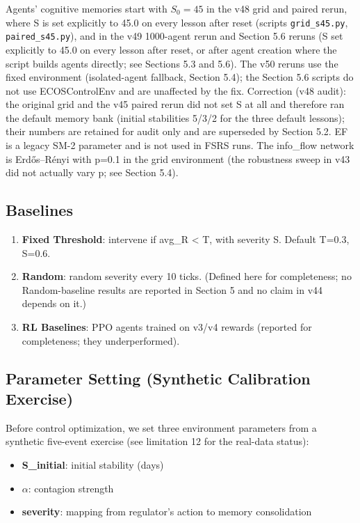 \documentclass[11pt]{article}
\begin{document}
Agents' cognitive memories start with $S_0 = 45$ in the v48 grid and paired rerun, where S is set explicitly to 45.0 on every lesson after reset (scripts \texttt{grid\_s45.py}, \texttt{paired\_s45.py}), and in the v49 1000-agent rerun and Section 5.6 reruns (S set explicitly to 45.0 on every lesson after reset, or after agent creation where the script builds agents directly; see Sections 5.3 and 5.6). The v50 reruns use the fixed environment (isolated-agent fallback, Section 5.4); the Section 5.6 scripts do not use ECOSControlEnv and are unaffected by the fix. Correction (v48 audit): the original grid and the v45 paired rerun did not set S at all and therefore ran the default memory bank (initial stabilities 5/3/2 for the three default lessons); their numbers are retained for audit only and are superseded by Section 5.2. EF is a legacy SM-2 parameter and is not used in FSRS runs. The info\_flow network is Erdős--Rényi with p=0.1 in the grid environment (the robustness sweep in v43 did not actually vary p; see Section 5.4).

\subsection{Baselines}
\begin{enumerate}
\item \textbf{Fixed Threshold}: intervene if avg\_R < T, with severity S. Default T=0.3, S=0.6.
\item \textbf{Random}: random severity every 10 ticks. (Defined here for completeness; no Random-baseline results are reported in Section 5 and no claim in v44 depends on it.)
\item \textbf{RL Baselines}: PPO agents trained on v3/v4 rewards (reported for completeness; they underperformed).
\end{enumerate}

\subsection{Parameter Setting (Synthetic Calibration Exercise)}
Before control optimization, we set three environment parameters from a synthetic five-event exercise (see limitation 12 for the real-data status):

\begin{itemize}
\item \textbf{S\_initial}: initial stability (days)
\item \textbf{$\alpha$}: contagion strength
\item \textbf{severity}: mapping from regulator's action to memory consolidation
\end{itemize}
\end{document}
